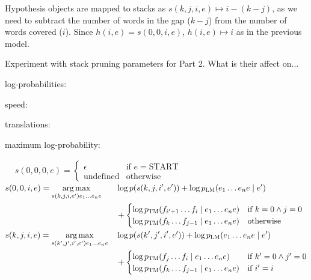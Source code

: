 \documentclass[answers]{exam}
\newcommand{\ptm}[1]{p_{\textsc{TM}}(#1)}
\newcommand{\plm}[1]{p_{\textsc{LM}}(#1)}
\DeclareMathOperator*{\argmax}{arg\,max}
\begin{document}
\begin{questions}
\begin{framed}
\end{framed}


\begin{framed}
  Hypothesis objects are mapped to stacks as $s(k,j,i,e)\mapsto i - (k - j)$, as
  we need to subtract the number of words in the gap ($k - j$) from the number
  of words covered ($i$). Since $h(i,e) = s(0,0,i,e)$, $h(i,e)\mapsto i$ as in
  the previous model.
\end{framed}


\addtocounter{question}{1}
\question[15] Experiment with stack pruning parameters for Part 2. What is their affect on...
\begin{framed}
\begin{compactenum}[a.]
\item log-probabilities:
\item speed:
\item translations:
\item maximum log-probability:
\end{compactenum}
\end{framed}


\begin{framed}
  \(\!
  \begin{aligned}
    &s(0,0,0,e) =
    \begin{cases}
      \epsilon         &\text{if }e = \text{START}\\
      \text{undefined} &\text{otherwise}
    \end{cases}
  \end{aligned}
  \)
  \\
  \(\!
  \begin{aligned}
    &s(0,0,i,e) = \argmax_{s(k,j,i,e')e_{1}\dots e_{n}e}
    &&\log{p(s(k,j,i',e'))} + \log{\plm{e_{1}\dots e_{n}e \mid e'}}
    \\& &&+
    \begin{cases}
      \log{\ptm{f_{i'+1}\dots f_{i} \mid e_{1}\dots e_{n}e}}
      &\text{if }k = 0 \land j = 0
      \\
      \log{\ptm{f_{k}\dots f_{j-1} \mid e_{1}\dots e_{n}e}}
      &\text{otherwise}
    \end{cases}
    \\
    &s(k,j,i,e) =
    \argmax_{s(k',j',i',e')e_{1}\dots e_{n}e}
    &&\log{p(s(k',j',i',e'))} + \log{\plm{e_{1}\dots e_{n}e \mid e'}} 
    \\& &&+
    \begin{cases}
      \log{\ptm{f_{j}\dots f_{i} \mid e_{1}\dots e_{n}e}}
      &\text{if }k' = 0 \land j' = 0
      \\
      \log{\ptm{f_{k}\dots f_{j-1} \mid e_{1}\dots e_{n}e}}
      &\text{if }i' = i
    \end{cases}
  \end{aligned}
  \)
\end{framed}



\end{questions}
\end{document}
